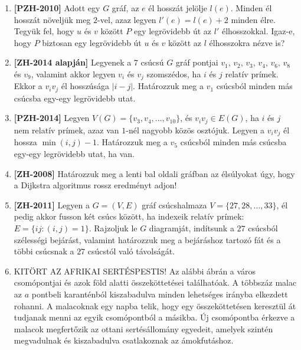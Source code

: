 \documentclass[a4paper,12pt]{article}
\begin{document}
\begin{enumerate}
        \item \textbf{[PZH-2010]} Adott egy $G$ gráf, az $e$ él hosszát jelölje $l(e)$. Minden él hosszát növeljük meg $2$-vel, azaz legyen $l'(e)=l(e)+2$ minden élre. Tegyük fel, hogy $u$ és $v$ között $P$ egy legrövidebb út az $l'$ élhosszokkal. Igaz-e, hogy $P$ biztosan egy legrövidebb út $u$ és $v$ között az $l$ élhosszokra nézve is?
        
        \item \textbf{[ZH-2014 alapján]} Legyenek a $7$ csúcsú $G$ gráf pontjai $v_1$, $v_2$, $v_3$, $v_4$, $v_6$, $v_8$ és $v_9$, valamint akkor legyen $v_i$ és $v_j$ szomszédos, ha $i$ és $j$ relatív prímek. Ekkor a $v_iv_j$ él hosszúsága $|i-j|$. Határozzuk meg a $v_1$ csúcsból minden más csúcsba egy-egy legrövidebb utat.
        
        \item \textbf{[PZH-2014]} Legyen $V(G) = \{v_3, v_4, \ldots, v_{10}\}$, és $v_iv_j \in E(G)$, ha $i$ és $j$ nem relatív prímek, azaz van $1$-nél nagyobb közös osztójuk. Legyen a $v_iv_j$ él hossza $\min(i,j) - 1$. Határozzuk meg a $v_5$ csúcsból minden más csúcsba egy-egy legrövidebb utat, ha van. 
        
        \item \textbf{[ZH-2008]} Határozzuk meg a lenti bal oldali gráfban az élsúlyokat úgy, hogy a Dijkstra algoritmus rossz eredményt adjon!
        \begin{figure}[h]
            \centering
            \begin{subfigure}{0.4\textwidth}
                \centering
                
            \end{subfigure}
        \end{figure}

        \item \label{feladat:zh2011} \textbf{[ZH-2011]} Legyen a $G=(V, E)$ gráf csúcshalmaza $V = \{27,28,\ldots,33\}$, él pedig akkor fusson két csúcs között, ha indexeik relatív prímek: $E = \{ij:(i,j) = 1\}$. Rajzoljuk le $G$ diagramját, indítsunk a $27$ csúcsból szélességi bejárást, valamint határozzuk meg a bejáráshoz tartozó fát és a többi csúcsnak a $27$ csúcstól való távolságát.

        \item KITÖRT AZ AFRIKAI SERTÉSPESTIS! Az alábbi ábrán a város csomópontjai és azok föld alatti összeköttetései találhatóak. A többszáz malac az $a$ pontbeli karanténból kiszabadulva minden lehetséges irányba elkezdett rohanni. A malacoknak egy napba telik, hogy egy összeköttetésen keresztül át tudjanak menni az egyik csomópontból a másikba. Új csomópontba érkezve a malacok megfertőzik az ottani sertésállomány egyedeit, amelyek szintén megvadulnak és kiszabadulva csatlakoznak az ámokfutáshoz.
        

\end{enumerate}
\end{document}
